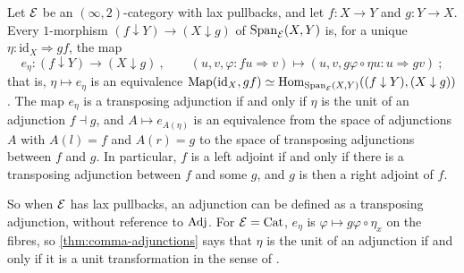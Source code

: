 \begin{thm}
\label{thm:comma-adjunctions}
%
Let $\mathcal{E}$ be an $(\infty,2)$-category with lax pullbacks, and let $f\colon X \to
Y$ and $g\colon Y \to X$. Every $1$-morphism
$(f \downarrow Y) \to (X \downarrow g)$
of $\mathrm{Span}_{\mathcal{E}}(X,Y)$ is, for a unique
$\eta\colon \mathrm{id}_{X} \Rightarrow gf$,
the map
\begin{equation*}
e_{\eta}\colon (f \downarrow Y) \to (X \downarrow g) \ ,
\qquad (u,v,\varphi\colon fu \Rightarrow v) \mapsto (u,v,g\varphi \circ \eta
u\colon u \Rightarrow gv) \ ;
\end{equation*}
that is,
$\eta \mapsto e_{\eta}$
is an equivalence
$\operatorname{Map}(\mathrm{id}_{X},gf) \simeq \operatorname{Hom}_{\mathrm{Span}_{\mathcal{E}}(X,Y)}((f \downarrow Y),(X
\downarrow g))$.
The map $e_{\eta}$ is a transposing adjunction if and only if $\eta$ is the unit
of an adjunction $f \dashv g$, and
$A \mapsto e_{A(\eta)}$
is an equivalence from the space of adjunctions $A$ with $A(l) = f$ and $A(r) =
g$ to the space of transposing adjunctions between $f$ and $g$.
In particular, $f$ is a left adjoint if and only if there is a transposing
adjunction between $f$ and some $g$, and $g$ is then a right adjoint of $f$.
\end{thm}

%
So when $\mathcal{E}$ has lax pullbacks, an adjunction can be defined as a transposing
adjunction, without reference to $\mathrm{Adj}$. For $\mathcal{E} = \mathrm{Cat}$, $e_{\eta}$ is
$\varphi \mapsto g\varphi \circ \eta_{x}$
on the fibres, so \cref{thm:comma-adjunctions} says that $\eta$ is the unit of
an adjunction if and only
if it is a unit transformation in the sense of \cite[Def.~5.2.2.7]{htt}.

